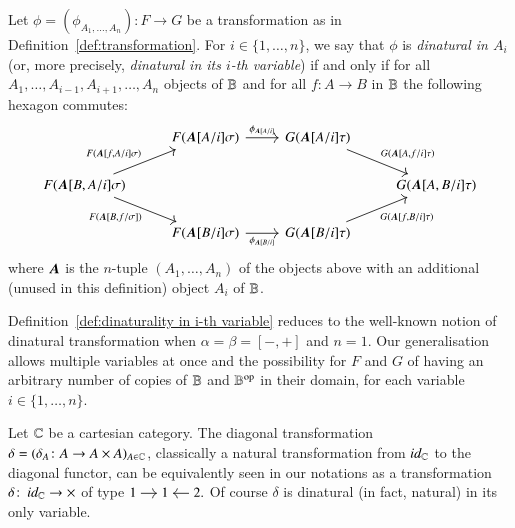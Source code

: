 \begin{definition}\label{def:dinaturality in i-th variable}
	Let $\phi = (\phi_{A_1,\dots,A_n}) \colon F \to G$ be a transformation as in Definition~\ref{def:transformation}. For $i \in \{1,\dots,n\}$, we say that $\phi$ is \emph{dinatural in $A_i$} (or, more precisely, \emph{dinatural in its $i$-th variable}) if and only if for all $A_1,\dots,A_{i-1}, A_{i+1},\dots,A_n$ objects of $\mathbb B$ and for all $f \colon A \to B$ in $\mathbb B$ the following hexagon commutes:
	\[
	\begin{tikzcd}
	& F(\subst \bfA A i \sigma) \ar[r,"\phi_{\subst \bfA A i}"] & G(\subst \bfA A i \tau) \ar[dr,"G(\substMV \bfA A f i \tau)"] \\
	F(\substMV \bfA B A i \sigma) \ar[ur,"F(\substMV \bfA f A i \sigma)"] \ar[dr,"F(\substMV \bfA B f \sigma)"'] & & & G(\substMV \bfA A B i \tau) \\
	& F(\subst \bfA B i \sigma) \ar[r,"\phi_{\subst \bfA B i}"'] & G(\subst \bfA B i \tau) \ar[ur,"G(\substMV \bfA f B i \tau)"']
	\end{tikzcd}
	\]
	where ${\boldsymbol A}$ is the $n$-tuple $(A_1,\dots,A_n)$ of the objects above with an additional (unused in this definition) object $A_i$ of $\mathbb B$.
\end{definition}

Definition~\ref{def:dinaturality in i-th variable} 
reduces to the well-known notion of dinatural transformation when $\alpha=\beta=[-,+]$ and $n=1$. Our generalisation allows multiple variables at once and the possibility for $F$ and $G$ of having an arbitrary number of copies of $\mathbb B$ and $\mathbb B^{\text{op}}$ in their domain, for each variable $i \in \{1,\dots,n\}$. 

\begin{example}\label{ex:delta}
	Let $\mathbb C$ be a cartesian category. The diagonal transformation $\delta=(\delta_A \colon A \to A \times A)_{A \in \mathbb C}$, classically a natural transformation from $\mathop{\textit{id}_{\mathbb C}}$ to the diagonal functor, can be equivalently seen in our notations as a transformation $\delta \colon \mathop{\textit{id}_{\mathbb C}} \to \times$ of type
	$
	\begin{tikzcd}[cramped,sep=small]
	1 \ar[r] & 1 & \ar[l] 2
	\end{tikzcd}.
	$ Of course $\delta$ is dinatural (in fact, natural) in its only variable.
\end{example}

